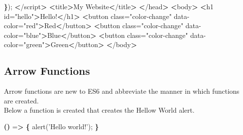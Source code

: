\documentclass[]{book}
\newenvironment{Shaded}{\begin{snugshade}}{\end{snugshade}}
\newcommand{\KeywordTok}[1]{\textcolor[rgb]{0.13,0.29,0.53}{\textbf{#1}}}
\newcommand{\StringTok}[1]{\textcolor[rgb]{0.31,0.60,0.02}{#1}}
\newcommand{\OperatorTok}[1]{\textcolor[rgb]{0.81,0.36,0.00}{\textbf{#1}}}
\newcommand{\ExtensionTok}[1]{#1}
\newcommand{\NormalTok}[1]{#1}
\begin{document}
\begin{Shaded}
\begin{Highlighting}[]
        \KeywordTok{\}}\NormalTok{);                                                                             }
    \OperatorTok{<}\NormalTok{/}\ExtensionTok{script}\OperatorTok{>}                                                                           
    \OperatorTok{<}\ExtensionTok{title}\OperatorTok{>}\NormalTok{My Website}\OperatorTok{<}\NormalTok{/title}\OperatorTok{>}                                                           
\OperatorTok{<}\NormalTok{/}\ExtensionTok{head}\OperatorTok{>}                                                                                 
\OperatorTok{<}\ExtensionTok{body}\OperatorTok{>}                                                                                  
    \OperatorTok{<}\ExtensionTok{h1}\NormalTok{ id=}\StringTok{"hello"}\OperatorTok{>}\NormalTok{Hello!}\OperatorTok{<}\NormalTok{/h1}\OperatorTok{>}                                                          
    \OperatorTok{<}\ExtensionTok{button}\NormalTok{ class=}\StringTok{"color-change"}\NormalTok{ data-color=}\StringTok{"red"}\OperatorTok{>}\NormalTok{Red}\OperatorTok{<}\NormalTok{/button}\OperatorTok{>}                          
    \OperatorTok{<}\ExtensionTok{button}\NormalTok{ class=}\StringTok{"color-change"}\NormalTok{ data-color=}\StringTok{"blue"}\OperatorTok{>}\NormalTok{Blue}\OperatorTok{<}\NormalTok{/button}\OperatorTok{>}                        
    \OperatorTok{<}\ExtensionTok{button}\NormalTok{ class=}\StringTok{"color-change"}\NormalTok{ data-color=}\StringTok{"green"}\OperatorTok{>}\NormalTok{Green}\OperatorTok{<}\NormalTok{/button}\OperatorTok{>}                      
\OperatorTok{<}\NormalTok{/}\ExtensionTok{body}\OperatorTok{>}                                                                                 
\end{Highlighting}
\end{Shaded}

\subsection{Arrow Functions}\label{arrow-functions}

Arrow functions are new to ES6 and abbreviate the manner in which
functions are created.\\
Below a function is created that creates the Hellow World alert.

\begin{Shaded}
\begin{Highlighting}[]
\KeywordTok{()}\NormalTok{ =}\OperatorTok{>} \KeywordTok{\{}
    \ExtensionTok{alert}\NormalTok{(}\StringTok{'Hello world!'}\NormalTok{);}
\KeywordTok{\}}
\end{Highlighting}
\end{Shaded}
\end{document}
